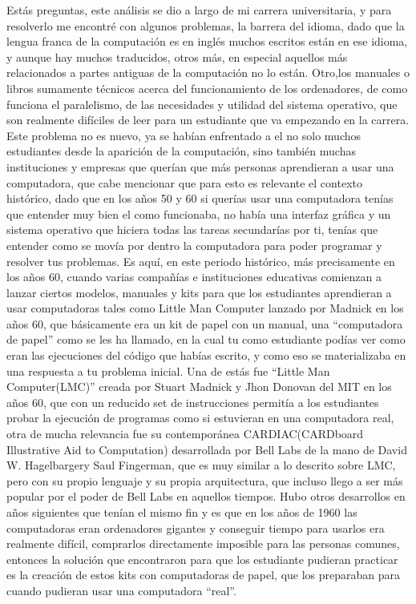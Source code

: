 \documentclass[letterpaper,12pt,oneside]{book}
\begin{document}
	 
	Estás preguntas, este análisis se dio a largo de mi carrera universitaria, y 
	para resolverlo me encontré con algunos problemas, la barrera del idioma, dado
	que la lengua franca de la computación es en inglés muchos escritos están en ese idioma, y aunque hay muchos traducidos, otros más, en especial aquellos más 
	relacionados a partes antiguas de la computación no lo están. Otro,los 
	manuales
	o libros sumamente técnicos acerca del funcionamiento de los ordenadores, de como funciona el paralelismo, de las necesidades y utilidad del sistema operativo, que
	son realmente difíciles de leer para un estudiante que va empezando en la carrera. Este problema no es nuevo, ya se habían enfrentado a el no solo muchos
	estudiantes desde la aparición de la computación, sino también muchas instituciones y empresas que querían que más personas aprendieran a usar una computadora,
	que cabe mencionar que para esto es relevante el contexto histórico, dado que en los años 50 y 60 si querías usar una computadora tenías que entender muy bien el como funcionaba,
	no había una interfaz gráfica y un sistema operativo que hiciera todas las tareas secundarías por ti, tenías que entender como se movía por dentro la computadora para
	poder programar y resolver tus problemas. Es aquí, en este periodo histórico, más precisamente en los años 60, cuando varias compañías e instituciones
	educativas comienzan a lanzar ciertos modelos, manuales y kits para que los estudiantes aprendieran a usar computadoras tales como Little Man Computer lanzado por
	Madnick en los años 60, que básicamente era un kit de papel con un manual, una ``computadora de papel'' como se les ha llamado, en la cual tu como estudiante
	podías ver como eran las ejecuciones del código que habías escrito, y como eso se materializaba en una respuesta a tu problema inicial. Una de estás fue 
	``Little Man Computer(LMC)'' creada por Stuart Madnick y Jhon Donovan del MIT en los años 60, que con un reducido set de instrucciones permitía a los estudiantes probar la
	ejecución de programas como si estuvieran en una computadora real, otra de mucha relevancia fue su contemporánea CARDIAC(CARDboard Illustrative Aid to Computation) 
	desarrollada por Bell Labs de la mano de David W. Hagelbargery Saul Fingerman, que es
	muy similar a lo descrito sobre LMC, pero con su propio lenguaje y su propia arquitectura, que incluso llego a ser  más popular
	por el poder de Bell Labs en aquellos tiempos. Hubo otros desarrollos en años siguientes que tenían el mismo fin y es que en los años de 1960
	las computadoras eran ordenadores gigantes y conseguir tiempo para usarlos era realmente difícil, comprarlos directamente imposible para las personas
	comunes, entonces la solución que encontraron para que los estudiante pudieran practicar es la creación de estos kits con computadoras de papel, que los
	preparaban  para cuando pudieran usar una computadora ``real''.
	
\end{document}
